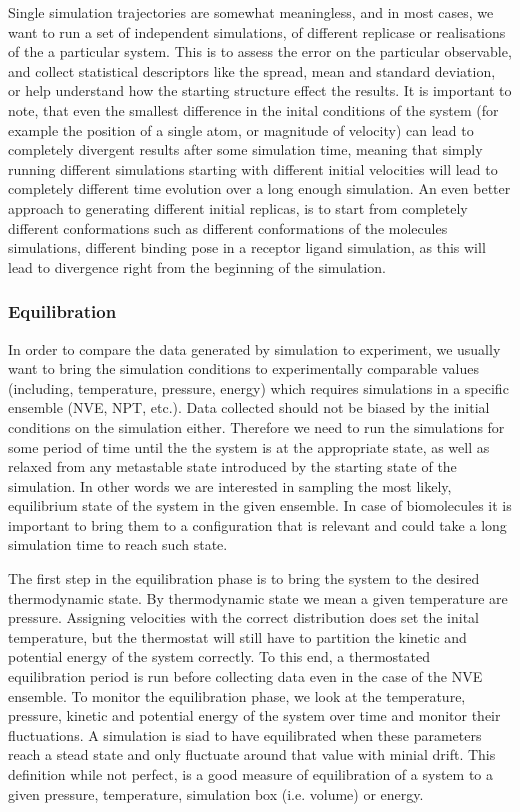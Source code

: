 Single simulation trajectories are somewhat meaningless, and in most cases, we want to run a set of independent simulations, of different replicase or realisations of the a particular system. This is to assess the error on the particular observable, and collect statistical descriptors like the spread, mean and standard deviation, or help understand how the starting structure effect the results. 
It is important to note, that even the smallest difference in the inital conditions of the system (for example the position of a single atom, or magnitude of velocity) can lead to completely divergent results after some simulation time, meaning that simply running different simulations starting with different initial velocities will lead to completely different time evolution over a long enough simulation. An even better approach to generating different initial replicas, is to start from completely different conformations such as different conformations of the molecules simulations, different binding pose in a receptor ligand simulation, as this will lead to divergence right from the beginning of the simulation.

\subsubsection{Equilibration}

In order to compare the data generated by simulation to experiment, we usually want to bring the simulation conditions to experimentally comparable values (including, temperature, pressure, energy) which requires simulations in a specific ensemble (NVE, NPT, etc.). Data collected should not be biased by the initial conditions on the simulation either. Therefore we need to run the simulations for some period of time until the the system is at the appropriate state, as well as relaxed from any metastable state introduced by the starting state of the simulation. In other words we are interested in sampling the most likely, equilibrium state of the system in the given ensemble. In case of biomolecules it is important to bring them to a configuration that is relevant and could take a long simulation time to reach such state.

The first step in the equilibration phase is to bring the system to the desired thermodynamic state. By thermodynamic state we mean a given temperature are pressure. Assigning velocities with the correct distribution does set the inital temperature, but the thermostat will still have to partition the kinetic and potential energy of the system correctly. To this end, a thermostated equilibration period is run before collecting data even in the case of the NVE ensemble. To monitor the equilibration phase, we look at the temperature, pressure, kinetic and potential energy of the system over time and monitor their fluctuations. A simulation is siad to have equilibrated when these parameters reach a stead state and only fluctuate around that value with minial drift. This definition while not perfect, is a good measure of equilibration of a system to a given pressure, temperature, simulation box (i.e. volume) or energy.

